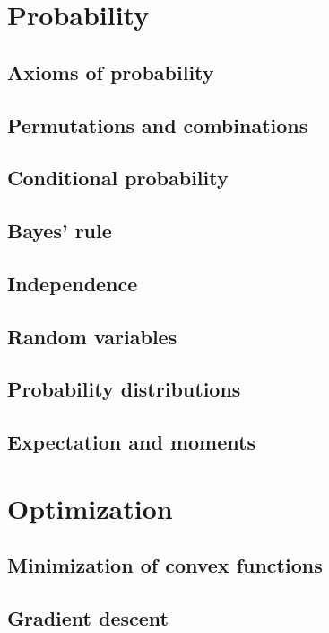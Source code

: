 \section{Probability}

\subsection{Axioms of probability}

\subsection{Permutations and combinations}

\subsection{Conditional probability}

\subsection{Bayes' rule}

\subsection{Independence}

\subsection{Random variables}

\subsection{Probability distributions}

\subsection{Expectation and moments}

\section{Optimization}

\subsection{Minimization of convex functions}

\subsection{Gradient descent}

